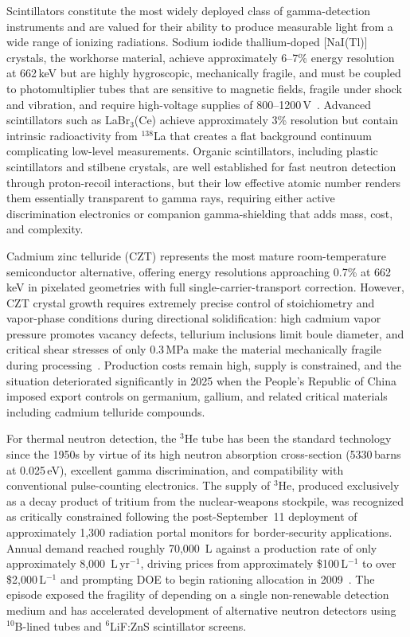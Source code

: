 Scintillators constitute the most widely deployed class of gamma-detection
instruments and are valued for their ability to produce measurable light from
a wide range of ionizing radiations. Sodium iodide thallium-doped
[NaI(Tl)] crystals, the workhorse material, achieve approximately 6--7\%
energy resolution at 662\,keV but are highly hygroscopic, mechanically
fragile, and must be coupled to photomultiplier tubes that are sensitive to
magnetic fields, fragile under shock and vibration, and require high-voltage
supplies of 800--1200\,V~\cite{Luxium_NaI}. Advanced scintillators such as
LaBr$_3$(Ce) achieve approximately 3\% resolution but contain intrinsic
radioactivity from $^{138}$La that creates a flat background continuum
complicating low-level measurements. Organic scintillators, including
plastic scintillators and stilbene crystals, are well established for fast
neutron detection through proton-recoil interactions, but their low effective
atomic number renders them essentially transparent to gamma rays, requiring
either active discrimination electronics or companion gamma-shielding that
adds mass, cost, and complexity.

Cadmium zinc telluride (CZT) represents the most mature room-temperature
semiconductor alternative, offering energy resolutions approaching 0.7\%
at 662\,keV in pixelated geometries with full single-carrier-transport
correction. However, CZT crystal growth requires extremely precise control
of stoichiometry and vapor-phase conditions during directional
solidification: high cadmium vapor pressure promotes vacancy defects,
tellurium inclusions limit boule diameter, and critical shear stresses
of only 0.3\,MPa make the material mechanically fragile during
processing~\cite{CZT_Wikipedia}. Production costs remain high, supply is
constrained, and the situation deteriorated significantly in 2025 when
the People's Republic of China imposed export controls on germanium,
gallium, and related critical materials including cadmium telluride compounds.

For thermal neutron detection, the $^3$He tube has been the standard
technology since the 1950s by virtue of its high neutron absorption
cross-section (5330\,barns at 0.025\,eV), excellent gamma discrimination,
and compatibility with conventional pulse-counting electronics. The
supply of $^3$He, produced exclusively as a decay product of tritium from
the nuclear-weapons stockpile, was recognized as critically constrained
following the post-September~11 deployment of approximately 1,300 radiation
portal monitors for border-security applications. Annual demand reached
roughly 70,000~L against a production rate of only approximately
8,000~L\,yr$^{-1}$, driving prices from approximately \$100\,L$^{-1}$ to
over \$2,000\,L$^{-1}$ and prompting DOE to begin rationing allocation in
2009~\cite{PhysicsToday_He3}. The episode exposed the fragility of depending
on a single non-renewable detection medium and has accelerated development
of alternative neutron detectors using $^{10}$B-lined tubes and
$^6$LiF:ZnS scintillator screens.

